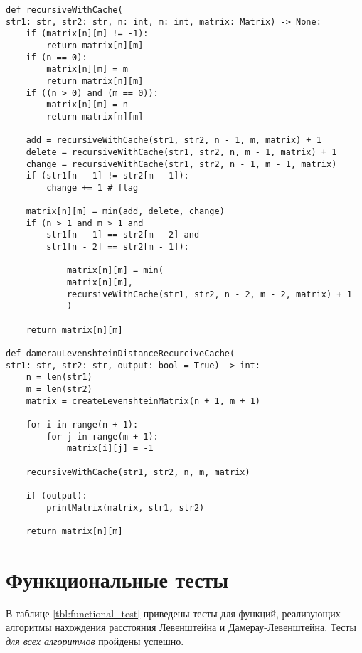 \begin{center}
    \captionsetup{justification=raggedright,singlelinecheck=off}
    \begin{lstlisting}[label=lst:dam_lev_rec_cache,caption=Алгоритм нахождения расстояния Дамерау-Левенштейна (рекурсивный с использованием кэша)]
def recursiveWithCache(
str1: str, str2: str, n: int, m: int, matrix: Matrix) -> None:
	if (matrix[n][m] != -1):
		return matrix[n][m]
	if (n == 0):
		matrix[n][m] = m
		return matrix[n][m]
	if ((n > 0) and (m == 0)):
		matrix[n][m] = n
		return matrix[n][m]
	
	add = recursiveWithCache(str1, str2, n - 1, m, matrix) + 1
	delete = recursiveWithCache(str1, str2, n, m - 1, matrix) + 1
	change = recursiveWithCache(str1, str2, n - 1, m - 1, matrix)
	if (str1[n - 1] != str2[m - 1]):
		change += 1 # flag
	
	matrix[n][m] = min(add, delete, change)
	if (n > 1 and m > 1 and
		str1[n - 1] == str2[m - 2] and
		str1[n - 2] == str2[m - 1]):
	
			matrix[n][m] = min(
			matrix[n][m],
			recursiveWithCache(str1, str2, n - 2, m - 2, matrix) + 1
			)
	
	return matrix[n][m]

def damerauLevenshteinDistanceRecurciveCache(
str1: str, str2: str, output: bool = True) -> int:
	n = len(str1)
	m = len(str2)
	matrix = createLevenshteinMatrix(n + 1, m + 1)
	
	for i in range(n + 1):
		for j in range(m + 1):
			matrix[i][j] = -1
		
	recursiveWithCache(str1, str2, n, m, matrix)
	
	if (output):
		printMatrix(matrix, str1, str2)
	
	return matrix[n][m]

\end{lstlisting}
\end{center}

\section{Функциональные тесты}

В таблице \ref{tbl:functional_test} приведены тесты для функций, реализующих алгоритмы нахождения расстояния Левенштейна и Дамерау-Левенштейна. Тесты \textit{для всех алгоритмов} пройдены успешно.


